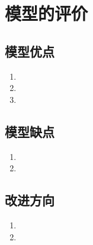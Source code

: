 \documentclass[withoutpreface,bwprint]{cumcmthesis} %
\begin{document}
\section{模型的评价}
\subsection{模型优点}
\begin{enumerate}
    \item 
    \item 
    \item 
\end{enumerate}

\subsection{模型缺点}
\begin{enumerate}
    \item 
    \item 
\end{enumerate}

\subsection{改进方向}
\begin{enumerate}
    \item 
    \item 
\end{enumerate}


\end{document}
